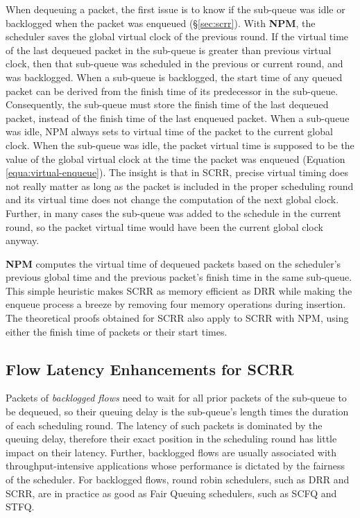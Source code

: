 When dequeuing a packet, the first issue is to know if the sub-queue
was idle or backlogged when the packet was enqueued
(\S\ref{sec:scrr}). With \textbf{NPM}, the scheduler saves the global
virtual clock of the previous round. If the virtual time of the last
dequeued packet in the sub-queue is greater than previous virtual
clock, then that sub-queue was scheduled in the previous or current
round, and was backlogged. When a sub-queue is backlogged, the start
time of any queued packet can be derived from the finish time of its
predecessor in the sub-queue. Consequently, the sub-queue must store
the finish time of the last dequeued packet, instead of the finish
time of the last enqueued packet. When a sub-queue was idle, NPM
always sets to virtual time of the packet to the current global
clock. When the sub-queue was idle, the packet virtual time is
supposed to be the value of the global virtual clock at the time the packet
was enqueued (Equation \ref{equa:virtual-enqueue}). The insight is
that in SCRR, precise virtual timing does not really matter as long as
the packet is included in the proper scheduling round and its virtual
time does not change the computation of the next global
clock. Further, in many cases the sub-queue was added to the schedule
in the current round, so the packet virtual time would have been the
current global clock anyway.

\textbf{NPM} computes the virtual time of dequeued packets
based on the scheduler's previous global time and the previous
packet's finish time in the same sub-queue. This simple heuristic
makes SCRR as memory efficient as DRR while making the enqueue process
a breeze by removing four memory operations during insertion. The
theoretical proofs obtained for SCRR also apply to SCRR with NPM,
using either the finish time of packets or their start times.

\subsection{Flow Latency Enhancements for SCRR}
\label{sec:enhancements}
\label{sec:latency}

Packets of \textit{backlogged flows} need to wait for all prior
packets of the sub-queue to be dequeued, so their queuing delay is the
sub-queue's length times the duration of each scheduling round. The
latency of such packets is dominated by the queuing delay, therefore
their exact position in the scheduling round has little impact on
their latency. Further, backlogged flows are usually associated with
throughput-intensive applications whose performance is dictated by the fairness of the scheduler. For
backlogged flows, round robin schedulers, such as DRR and SCRR, are in
practice as good as Fair Queuing schedulers, such as SCFQ and STFQ.

